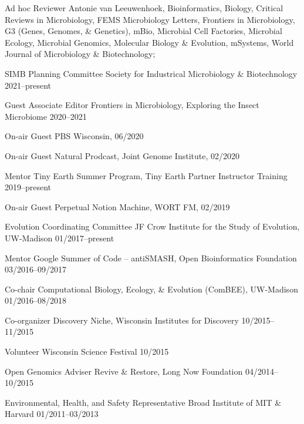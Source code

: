 

\begin{cvhonors}

\cvhonor
{Ad hoc Reviewer}
{Antonie van Leeuwenhoek, Bioinformatics, Biology, Critical Reviews in Microbiology, FEMS Microbiology Letters, Frontiers in Microbiology, G3 (Genes, Genomes, \& Genetics), mBio, Microbial Cell Factories, Microbial Ecology, Microbial Genomics, Molecular Biology \& Evolution, mSystems, World Journal of Microbiology \& Biotechnology; \textbf{\textit{}}}
{}

\cvhonor
{SIMB Planning Committee}
{Society for Industrical Microbiology \& Biotechnology}
{2021--present}

\cvhonor
{Guest Associate Editor}
{Frontiers in Microbiology, Exploring the Insect Microbiome}
{2020--2021}

\cvhonor
{On-air Guest}
{PBS Wisconsin, \textbf{\textit{}}}
{06/2020}

\cvhonor
{On-air Guest}
{Natural Prodcast, Joint Genome Institute, \textbf{\textit{}}}
{02/2020}

\cvhonor
{Mentor}
{Tiny Earth Summer Program, Tiny Earth Partner Instructor Training}
{2019--present}

\cvhonor
{On-air Guest}
{Perpetual Notion Machine, WORT FM, \textbf{\textit{}}}
{02/2019}

\cvhonor
{Evolution Coordinating Committee}
{JF Crow Institute for the Study of Evolution, UW-Madison}
{01/2017--present}

\cvhonor
{Mentor}
{Google Summer of Code -- antiSMASH, Open Bioinformatics Foundation}
{03/2016--09/2017}

\cvhonor
{Co-chair}
{Computational Biology, Ecology, \& Evolution (ComBEE), UW-Madison}
{01/2016--08/2018}

\cvhonor
{Co-organizer}
{Discovery Niche, Wisconsin Institutes for Discovery}
{10/2015--11/2015}

\cvhonor
{Volunteer}
{Wisconsin Science Festival}
{10/2015}

\end{cvhonors} \begin{cvhonors}

\cvhonor
{Open Genomics Adviser}
{Revive \& Restore, Long Now Foundation}
{04/2014--10/2015}

\cvhonor
{Environmental, Health, and Safety Representative}
{Broad Institute of MIT \& Harvard}
{01/2011--03/2013}

\end{cvhonors}